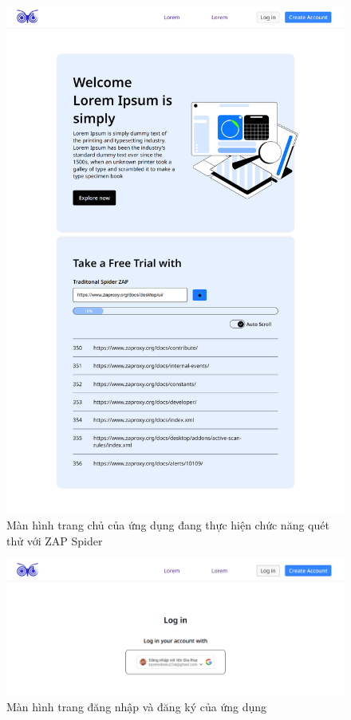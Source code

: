 \begin{figure}[H]
    \centering
    \includegraphics[width=\textwidth]{images/prototype/prototype_22112022/home_scanning.png}
    \caption{Màn hình trang chủ của ứng dụng đang thực hiện chức năng quét thử với ZAP Spider}
\end{figure}

\begin{figure}[H]
    \centering
\includegraphics[width=\textwidth]{images/prototype/prototype_22112022/login.png}
    \caption{Màn hình trang đăng nhập và đăng ký của ứng dụng}
\end{figure}

